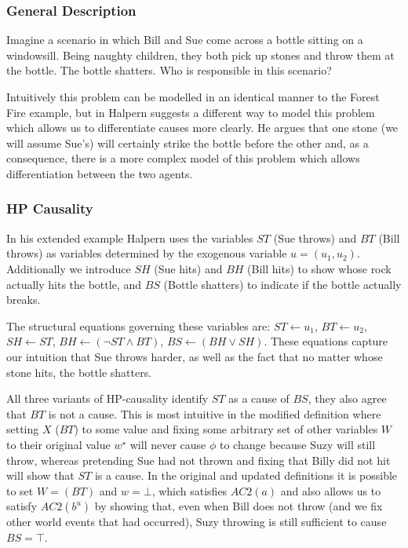 \documentclass{article}
\theoremstyle{plain}
\theoremstyle{definition}
\begin{document}
\subsubsection*{General Description}
Imagine a scenario in which Bill and Sue come across a bottle sitting on a windowsill. Being naughty children, they both pick up stones and throw them at the bottle. The bottle shatters. Who is responsible in this scenario?

Intuitively this problem can be modelled in an identical manner to the Forest Fire example, but in \cite{halpern2005causes} Halpern suggests a different way to model this problem which allows us to differentiate causes more clearly. He argues that one stone (we will assume Sue's) will certainly strike the bottle before the other and, as a consequence, there is a more complex model of this problem which allows differentiation between the two agents.



\subsubsection*{HP Causality}
In his extended example Halpern uses the variables $ST$ (Sue throws) and $BT$ (Bill throws) as variables determined by the exogenous variable $u=(u_1, u_2)$. Additionally we introduce $SH$ (Sue hits) and $BH$ (Bill hits) to show whose rock actually hits the bottle, and $BS$ (Bottle shatters) to indicate if the bottle actually breaks.

The structural equations governing these variables are: $ST\leftarrow u_1$, $BT\leftarrow u_2$, $SH \leftarrow ST$, $BH \leftarrow (\lnot ST \land BT)$, $BS \leftarrow (BH \lor SH)$. These equations capture our intuition that Sue throws harder, as well as the fact that no matter whose stone hits, the bottle shatters.

All three variants of HP-causality identify $ST$ as a cause of $BS$, they also agree that $BT$ is not a cause. This is most intuitive in the modified definition where setting $X$ ($BT$) to some value and fixing some arbitrary set of other variables $W$ to their original value $w^\star$ will never cause $\phi$ to change because Suzy will still throw, whereas pretending Sue had not thrown and fixing that Billy did not hit will show that $ST$ is a cause. In the original and updated definitions it is possible to set $W=(BT)$ and $w=\bot$, which satisfies $AC2(a)$ and also allows us to satisfy $AC2(b^u)$ by showing that, even when Bill does not throw (and we fix other world events that had occurred), Suzy throwing is still sufficient to cause $BS=\top$. 
\end{document}
